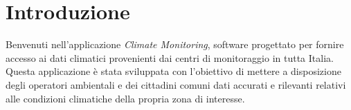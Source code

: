 \NoBgThispage
\section{Introduzione}
Benvenuti nell'applicazione \emph{Climate Monitoring}, software progettato per fornire accesso ai dati climatici 
provenienti dai centri di monitoraggio in tutta Italia. Questa applicazione è stata sviluppata con l'obiettivo di 
mettere a disposizione degli operatori ambientali e dei cittadini comuni dati accurati e rilevanti relativi alle 
condizioni climatiche della propria zona di interesse.
